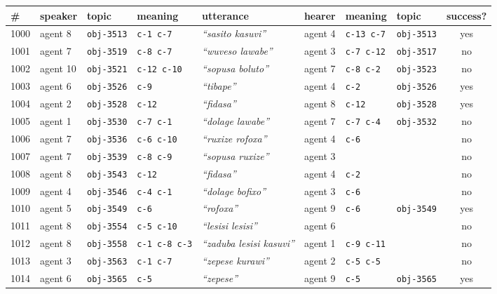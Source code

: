 
\renewcommand{\arraystretch}{1.3}{
  \begin{tabular}{@{}llllllllc@{}}
    \# & speaker & topic & meaning & utterance & hearer & meaning & topic & success? \\
    \hline
    1000 & agent 8 & \texttt{obj-3513} & \texttt{c-1 c-7} & \textit{``sasito kasuvi''} & agent 4 & \texttt{c-13 c-7} & \texttt{obj-3513} & yes \\
    1001 & agent 7 & \texttt{obj-3519} & \texttt{c-8 c-7} & \textit{``wuveso lawabe''} & agent 3 & \texttt{c-7 c-12} & \texttt{obj-3517} & no \\
    1002 & agent 10 & \texttt{obj-3521} & \texttt{c-12 c-10} & \textit{``sopusa boluto''} & agent 7 & \texttt{c-8 c-2} & \texttt{obj-3523} & no \\
    1003 & agent 6 & \texttt{obj-3526} & \texttt{c-9} & \textit{``tibape''} & agent 4 & \texttt{c-2} & \texttt{obj-3526} & yes \\
    1004 & agent 2 & \texttt{obj-3528} & \texttt{c-12} & \textit{``fidasa''} & agent 8 & \texttt{c-12} & \texttt{obj-3528} & yes \\
    1005 & agent 1 & \texttt{obj-3530} & \texttt{c-7 c-1} & \textit{``dolage lawabe''} & agent 7 & \texttt{c-7 c-4} & \texttt{obj-3532} & no \\
    1006 & agent 7 & \texttt{obj-3536} & \texttt{c-6 c-10} & \textit{``ruxize rofoxa''} & agent 4 & \texttt{c-6} &  & no \\
    1007 & agent 7 & \texttt{obj-3539} & \texttt{c-8 c-9} & \textit{``sopusa ruxize''} & agent 3 & \texttt{} &  & no \\
    1008 & agent 8 & \texttt{obj-3543} & \texttt{c-12} & \textit{``fidasa''} & agent 4 & \texttt{c-2} &  & no \\
    1009 & agent 4 & \texttt{obj-3546} & \texttt{c-4 c-1} & \textit{``dolage bofixo''} & agent 3 & \texttt{c-6} &  & no \\
    1010 & agent 5 & \texttt{obj-3549} & \texttt{c-6} & \textit{``rofoxa''} & agent 9 & \texttt{c-6} & \texttt{obj-3549} & yes \\
    1011 & agent 8 & \texttt{obj-3554} & \texttt{c-5 c-10} & \textit{``lesisi lesisi''} & agent 6 & \texttt{} &  & no \\
    1012 & agent 8 & \texttt{obj-3558} & \texttt{c-1 c-8 c-3} & \textit{``zaduba lesisi kasuvi''} & agent 1 & \texttt{c-9 c-11} &  & no \\
    1013 & agent 3 & \texttt{obj-3563} & \texttt{c-1 c-7} & \textit{``zepese kurawi''} & agent 2 & \texttt{c-5 c-5} &  & no \\
    1014 & agent 6 & \texttt{obj-3565} & \texttt{c-5} & \textit{``zepese''} & agent 9 & \texttt{c-5} & \texttt{obj-3565} & yes \\
 \end{tabular}}


